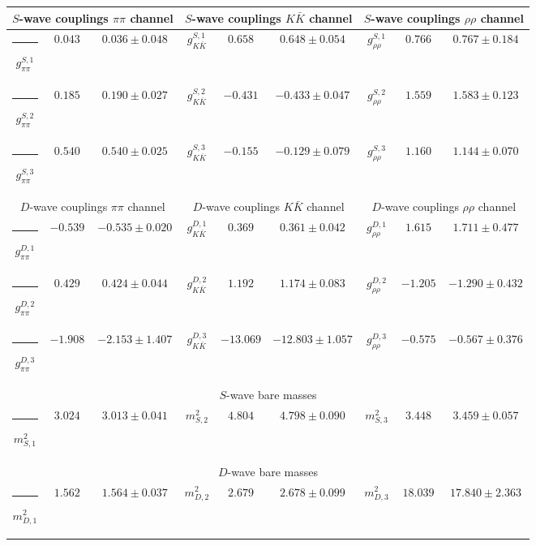 \begin{table}[h]
\begin{ruledtabular}
\begin{tabular}{c c c c c c c c c}
\multicolumn{3}{c}{$S$-wave couplings $\pi \pi$ channel}  & \multicolumn{3}{c}{$S$-wave couplings $K  \bar K$ channel} & \multicolumn{3}{c}{$S$-wave couplings $\rho\rho$ channel} \\ \hline
\rule[-0.2cm]{-0.1cm}{.55cm} $g^{S,1}_{\pi\pi}$ & $0.043$ & $0.036 \pm 0.048$ & $g^{S,1}_{K\bar K}$ & $0.658$ & $0.648 \pm 0.054$ & $g^{S,1}_{\rho\rho}$ & $0.766$ & $0.767 \pm 0.184$ \\
\rule[-0.2cm]{-0.1cm}{.55cm} $g^{S,2}_{\pi\pi}$ & $0.185$ & $0.190 \pm 0.027$ & $g^{S,2}_{K\bar K}$ & $-0.431$ & $-0.433 \pm 0.047$ & $g^{S,2}_{\rho\rho}$ & $1.559$ & $1.583 \pm 0.123$ \\
\rule[-0.2cm]{-0.1cm}{.55cm} $g^{S,3}_{\pi\pi}$ & $0.540$ & $0.540 \pm 0.025$ & $g^{S,3}_{K\bar K}$ & $-0.155$ & $-0.129 \pm 0.079$ & $g^{S,3}_{\rho\rho}$ & $1.160$ & $1.144 \pm 0.070$ \\
\hline 
\multicolumn{3}{c}{$D$-wave couplings $\pi \pi$ channel}  & \multicolumn{3}{c}{$D$-wave couplings $K  \bar K$ channel} & \multicolumn{3}{c}{$D$-wave couplings $\rho\rho$ channel} \\ \hline
\rule[-0.2cm]{-0.1cm}{.55cm} $g^{D,1}_{\pi\pi}$ & $-0.539$ & $-0.535 \pm 0.020$ & $g^{D,1}_{K\bar K}$ & $0.369$ & $0.361 \pm 0.042$ & $g^{D,1}_{\rho\rho}$ & $1.615$ & $1.711 \pm 0.477$ \\
\rule[-0.2cm]{-0.1cm}{.55cm} $g^{D,2}_{\pi\pi}$ & $0.429$ & $0.424 \pm 0.044$ & $g^{D,2}_{K\bar K}$ & $1.192$ & $1.174 \pm 0.083$ & $g^{D,2}_{\rho\rho}$ & $-1.205$ & $-1.290 \pm 0.432$ \\
\rule[-0.2cm]{-0.1cm}{.55cm} $g^{D,3}_{\pi\pi}$ & $-1.908$ & $-2.153 \pm 1.407$ & $g^{D,3}_{K\bar K}$ & $-13.069$ & $-12.803 \pm 1.057$ & $g^{D,3}_{\rho\rho}$ & $-0.575$ & $-0.567 \pm 0.376$ \\
\hline 
\multicolumn{9}{c}{$S$-wave bare masses}   \\ \hline
\rule[-0.2cm]{-0.1cm}{.55cm} $m^2_{S,1}$ & $3.024$ & $3.013 \pm 0.041$ & $m^2_{S,2}$ & $4.804$ & $4.798 \pm 0.090$ & $m^2_{S,3}$ & $3.448$ & $3.459 \pm 0.057$ \\
\hline 
\multicolumn{9}{c}{$D$-wave bare masses}   \\ \hline
\rule[-0.2cm]{-0.1cm}{.55cm} $m^2_{D,1}$ & $1.562$ & $1.564 \pm 0.037$ & $m^2_{D,2}$ & $2.679$ & $2.678 \pm 0.099$ & $m^2_{D,3}$ & $18.039$ & $17.840 \pm 2.363$ \\

\end{tabular}
\end{ruledtabular}
\end{table}
